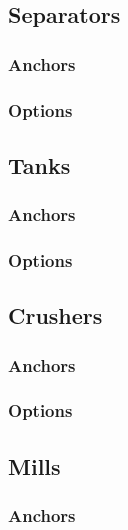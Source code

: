 \documentclass[a4paper, twoside]{article}
\begin{document}
    \subsection{Separators}
        \subsubsection{Anchors}
            

        \subsubsection{Options}
            

    \subsection{Tanks}
        \subsubsection{Anchors}
            

        \subsubsection{Options}
            

    \subsection{Crushers}
        \subsubsection{Anchors}
            

        \subsubsection{Options}
            

    \subsection{Mills}
        \subsubsection{Anchors}
            
\end{document}
